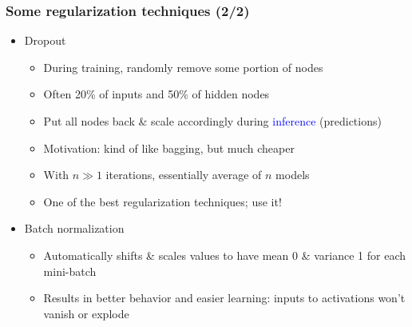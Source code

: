 \begin{frame}
    \frametitle{Some regularization techniques (2/2)}
    \begin{itemize}
        \item<+-> \alert{Dropout} \citep{SrivastavaJMLR14}
        \begin{itemize}[<.->]
            \item During \textcolor{Green4}{training}, randomly remove some portion of nodes
            \item Often 20\% of inputs and 50\% of hidden nodes
            \item<+-> Put all nodes back \& scale accordingly during \textcolor{blue}{inference} (predictions)
            \item<+-> Motivation: kind of like bagging, but much cheaper
            \item With $n \gg 1$ iterations, essentially average of $n$ models
            \item One of the best regularization techniques; use it!
        \end{itemize}
    \end{itemize}

    
    \hfill
    
    \hfill
    
    \hfill

    \begin{itemize}
        \item<+-> \alert{Batch normalization} \citep{IoffeICML15}
        \begin{itemize}
            \item Automatically shifts \& scales values to have mean 0 \& variance 1 for each mini-batch
            \item Results in better behavior and easier learning: inputs to activations won't vanish or explode
        \end{itemize}
    \end{itemize}
\end{frame}

